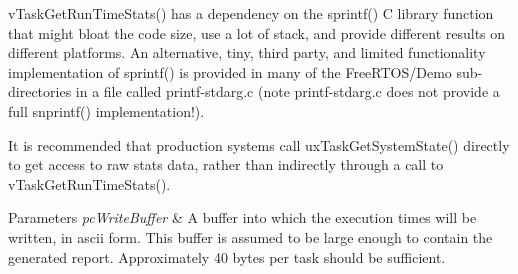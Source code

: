v\-Task\-Get\-Run\-Time\-Stats() has a dependency on the sprintf() C library function that might bloat the code size, use a lot of stack, and provide different results on different platforms. An alternative, tiny, third party, and limited functionality implementation of sprintf() is provided in many of the Free\-R\-T\-O\-S/\-Demo sub-\/directories in a file called printf-\/stdarg.\-c (note printf-\/stdarg.\-c does not provide a full snprintf() implementation!).

It is recommended that production systems call ux\-Task\-Get\-System\-State() directly to get access to raw stats data, rather than indirectly through a call to v\-Task\-Get\-Run\-Time\-Stats().


\begin{DoxyParams}{Parameters}
{\em pc\-Write\-Buffer} & A buffer into which the execution times will be written, in ascii form. This buffer is assumed to be large enough to contain the generated report. Approximately 40 bytes per task should be sufficient. \\
\hline
\end{DoxyParams}
